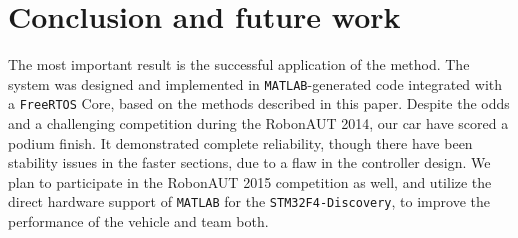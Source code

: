 \section{Conclusion and future work}

The most important result is the successful application of the method. The system was designed and implemented in \verb!MATLAB!-generated code integrated with a \verb!FreeRTOS! Core, based on the methods described in this paper. Despite the odds and a challenging competition during the RobonAUT 2014, our car have scored a podium finish. It demonstrated complete reliability, though there have been stability issues in the faster sections, due to a flaw in the controller design. We plan to participate in the RobonAUT 2015 competition as well, and utilize the direct hardware support of \verb!MATLAB! for the \texttt{STM32F4-Discovery}, to improve the performance of the vehicle and team both.